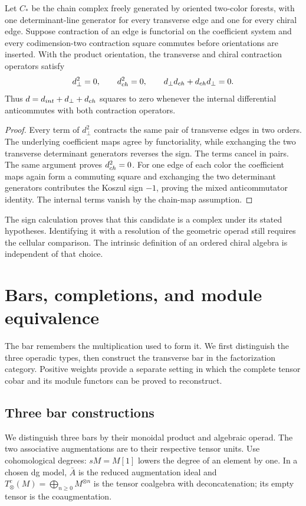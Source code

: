 \begin{theorem}
Let $C_*$ be the chain complex freely generated by oriented two-color forests, with one determinant-line generator for every transverse edge and one for every chiral edge.  Suppose contraction of an edge is functorial on the coefficient system and every codimension-two contraction square commutes before orientations are inserted.  With the product orientation, the transverse and chiral contraction operators satisfy
\[
 d_\perp^2=0,\qquad d_{ch}^2=0,\qquad
 d_\perp d_{ch}+d_{ch}d_\perp=0.
\]
Thus $d=d_{int}+d_\perp+d_{ch}$ squares to zero whenever the internal differential anticommutes with both contraction operators.
\end{theorem}
\begin{proof}
Every term of $d_\perp^2$ contracts the same pair of transverse edges in two orders.  The underlying coefficient maps agree by functoriality, while exchanging the two transverse determinant generators reverses the sign.  The terms cancel in pairs.  The same argument proves $d_{ch}^2=0$.  For one edge of each color the coefficient maps again form a commuting square and exchanging the two determinant generators contributes the Koszul sign $-1$, proving the mixed anticommutator identity.  The internal terms vanish by the chain-map assumption.
\end{proof}

The sign calculation proves that this candidate is a complex under its stated hypotheses. Identifying it with a resolution of the geometric operad still requires the cellular comparison. The intrinsic definition of an ordered chiral algebra is independent of that choice.

\chapter{Bars, completions, and module equivalence}

The bar remembers the multiplication used to form it.
We first distinguish the three operadic types, then construct the transverse bar
in the factorization category. Positive weights provide a separate setting in
which the complete tensor cobar and its module functors can be proved to reconstruct.

\section{Three bar constructions}
We distinguish three bars by their monoidal product and algebraic operad.
The two associative augmentations are to their respective tensor units.
Use cohomological degrees: $sM=M[1]$ lowers the degree of an element by one.
In a chosen dg model, $\bar A$ is the reduced augmentation ideal and
$T^c_\otimes(M)=\bigoplus_{n\ge0}M^{\otimes n}$ is the tensor coalgebra
with deconcatenation; its empty tensor is the coaugmentation.

